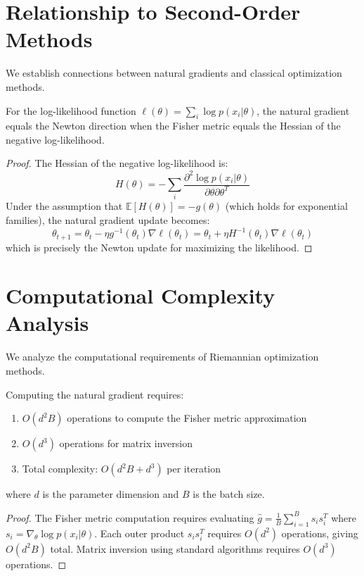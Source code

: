 \section{Relationship to Second-Order Methods}

We establish connections between natural gradients and classical optimization methods.

\begin{theorem}
\label{thm:newton_equivalence}
For the log-likelihood function $\ell(\theta) = \sum_i \log p(x_i|\theta)$, the natural gradient equals the Newton direction when the Fisher metric equals the Hessian of the negative log-likelihood.
\end{theorem}

\begin{proof}
The Hessian of the negative log-likelihood is:
$$H(\theta) = -\sum_i \frac{\partial^2 \log p(x_i|\theta)}{\partial \theta \partial \theta^T}$$
Under the assumption that $\mathbb{E}[H(\theta)] = -g(\theta)$ (which holds for exponential families), the natural gradient update becomes:
$$\theta_{t+1} = \theta_t - \eta g^{-1}(\theta_t) \nabla \ell(\theta_t) = \theta_t + \eta H^{-1}(\theta_t) \nabla \ell(\theta_t)$$
which is precisely the Newton update for maximizing the likelihood.
\end{proof}

\section{Computational Complexity Analysis}

We analyze the computational requirements of Riemannian optimization methods.

\begin{theorem}
\label{thm:complexity_analysis}
Computing the natural gradient requires:
\begin{enumerate}
\item $O(d^2 B)$ operations to compute the Fisher metric approximation
\item $O(d^3)$ operations for matrix inversion
\item Total complexity: $O(d^2 B + d^3)$ per iteration
\end{enumerate}
where $d$ is the parameter dimension and $B$ is the batch size.
\end{theorem}

\begin{proof}
The Fisher metric computation requires evaluating $\hat{g} = \frac{1}{B} \sum_{i=1}^B s_i s_i^T$ where $s_i = \nabla_\theta \log p(x_i|\theta)$. Each outer product $s_i s_i^T$ requires $O(d^2)$ operations, giving $O(d^2 B)$ total. Matrix inversion using standard algorithms requires $O(d^3)$ operations.
\end{proof}

